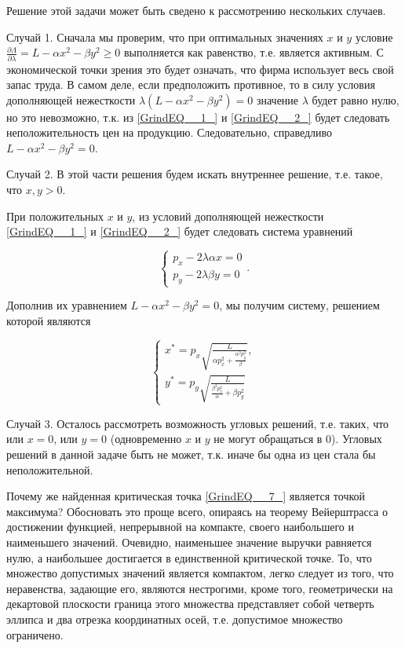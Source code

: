 \begin{solution}
Решение этой задачи может быть сведено к рассмотрению нескольких случаев.

Случай 1. Сначала мы проверим, что при оптимальных значениях $x$ и $y$ условие $\frac{\partial \Lambda }{\partial \lambda } =L-\alpha x^{2} -\beta y^{2} \ge 0$ выполняется как равенство, т.е. является активным. С экономической точки зрения это будет означать, что фирма использует весь свой запас труда. В самом деле, если предположить противное, то в силу условия дополняющей нежесткости $\lambda (L-\alpha x^{2} -\beta y^{2} )=0$ значение $\lambda $ будет равно нулю, но это невозможно, т.к. из \ref{GrindEQ__1_} и \ref{GrindEQ__2_} будет следовать неположительность цен на продукцию. Следовательно, справедливо  $L-\alpha x^{2} -\beta y^{2} =0$.

Случай 2. В этой части решения будем искать внутреннее решение, т.е. такое, что $x,y>0$.

При положительных $x$ и $y$, из условий дополняющей нежесткости \ref{GrindEQ__1_} и \ref{GrindEQ__2_} будет следовать система уравнений

\begin{equation}
\begin{cases}
p_{x} -2\lambda \alpha x=0 \\
p_{y} -2\lambda \beta y=0
\end{cases}.
\end{equation} 

Дополнив их уравнением $L-\alpha x^2-\beta y^2=0$, мы получим систему, решением которой являются 

\begin{equation} \label{GrindEQ__7_} 
\begin{cases}
x^*=p_{x} \sqrt{\frac{L}{\alpha p_{x}^{2} +\frac{\alpha ^{2} p_{y}^{2} }{\beta } } } , \\
y^*=p_{y} \sqrt{\frac{L}{\frac{\beta ^{2} p_{x}^{2} }{\alpha } +\beta p_{y}^{2} } } 
\end{cases}
\end{equation}

Случай 3. Осталось рассмотреть возможность угловых решений, т.е. таких, что или $x=0$, или $y=0$ (одновременно $x$ и $y$ не могут обращаться в 0). Угловых решений в данной задаче быть не может, т.к. иначе бы одна из цен стала бы неположительной.

Почему же найденная критическая точка \ref{GrindEQ__7_} является точкой максимума? Обосновать это проще всего, опираясь на теорему Вейерштрасса о достижении функцией, непрерывной на компакте, своего наибольшего и наименьшего значений. Очевидно, наименьшее значение выручки равняется нулю, а наибольшее достигается в единственной критической точке. То, что множество допустимых значений является компактом, легко следует из того, что неравенства, задающие его, являются нестрогими, кроме того, геометрически на декартовой плоскости граница этого множества представляет собой четверть эллипса и два отрезка координатных осей, т.е. допустимое множество ограничено.
\end{solution}


